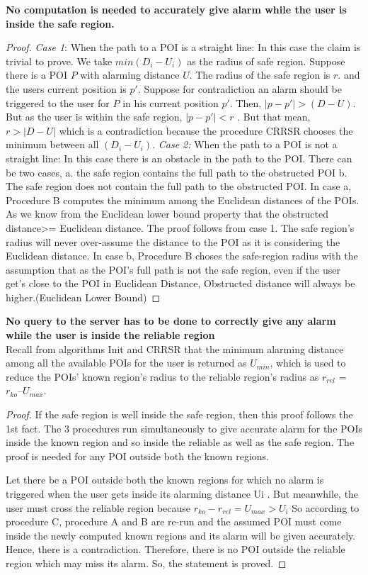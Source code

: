 \documentclass{sig-alternate}
\begin{document}
\textbf{No computation is needed to accurately give alarm while the user is inside the safe region.}\\

\begin{proof}
\textit{Case 1}: When the path to a POI is a straight line: 
In this case the claim is trivial to prove. We take $min( D_i - U_i )$ as the radius of safe region. Suppose there is a POI $P$ with alarming distance $U$. The radius of the safe region is $r$. and the users current position is $p'$. Suppose for contradiction an alarm should be triggered to the user for $P$ in his current position $p'$. Then, $|p-p'|>(D-U)$. But as the user is within the safe region, $|p-p'|<r$ . But that mean, $r>|D-U|$ which is a contradiction because the procedure CRRSR chooses the minimum between all $(D_i - U_i )$.
\textit{Case 2:} When the path to a POI is not a straight line: 
In this case there is an obstacle in the path to the POI. There can be two cases, 
a. the safe region contains the full path to the obstructed POI 
b. The safe region does not contain the full path to the obstructed POI.
In case a, Procedure B computes the minimum among the Euclidean distances of the POIs. As we know from the Euclidean lower bound property that the obstructed distance>= Euclidean distance. The proof follows from case 1. The safe region's radius will never over-assume the distance to the POI as it is considering the Euclidean distance.
In case b, Procedure B choses the safe-region radius with the assumption that as the POI's full path is not the safe region, even if the user get's close to the POI in Euclidean Distance, Obstructed distance will always be higher.(Euclidean Lower Bound)
\end{proof}

\textbf{No query to the server has to be done to correctly give any alarm while the user is inside the reliable region}\\
Recall from algorithms Init and CRRSR that the minimum alarming distance among all the available POIs for the user is returned as $U_{min}$, which is used to reduce the POIs' known region's radius to the reliable region's radius as $r_{rel}$ = $r_{ko} – U_{max}$.

\begin{proof}
If the safe region is well inside the safe region, then this proof follows the 1st fact.
The 3 procedures run simultaneously to give accurate alarm for the POIs inside the known region and so inside the reliable as well as the safe region.
The proof is needed for any POI outside both the known regions.

Let there be a POI outside both the known regions for which no alarm is triggered when the user gets inside its alarming distance Ui . 
But meanwhile, the user must cross the reliable region because $r_{ko} - r_{rel} = U_{max} > U_i$ 
So according to procedure C, procedure A and B are re-run and the assumed POI must come inside the newly computed known regions and its alarm will be given accurately.
Hence, there is a contradiction.
Therefore, there is no POI outside the reliable region which may miss its alarm.
So, the statement is proved.
\end{proof}
\end{document}
